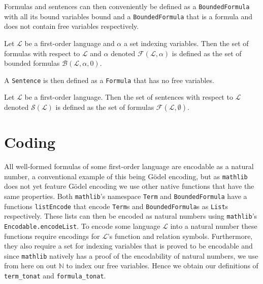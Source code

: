 Formulas and sentences can then conveniently be defined as a \texttt{BoundedFormula} with all its bound variables bound and a \texttt{BoundedFormula} that is a formula and does not contain free variables respectively.

\begin{definition}\label{def:FO-Formula}
  \leanok
    Let $\mathcal{L}$ be a first-order language and $\alpha$ a set indexing variables. Then the set of formulas with respect to $\mathcal{L}$ and $\alpha$ denoted $\mathcal{F}(\mathcal{L},\alpha)$ is defined as the set of bounded formulas $\mathcal{B}(\mathcal{L},\alpha,0)$.
\end{definition}

A \texttt{Sentence} is then defined as a \texttt{Formula} that has no free variables.

\begin{definition}\label{def:FO-Sentence}
  \leanok
    Let $\mathcal{L}$ be a first-order language. Then the set of sentences with respect to $\mathcal{L}$ denoted $\mathcal{S}(\mathcal{L})$ is defined as the set of formulas $\mathcal{F}(\mathcal{L},\emptyset)$.
\end{definition}

\section{Coding}\label{subsec:coding}
All well-formed formulas of some first-order language are encodable as a natural number, a conventional example of this being Gödel encoding, but as \texttt{mathlib} does not yet feature Gödel encoding we use other native functions that have the same properties. Both \texttt{mathlib}'s namespace \texttt{Term} and \texttt{BoundedFormula} have a functions \texttt{listEncode} that encode \texttt{Term}s and \texttt{BoundedFormula}s as \texttt{List}s respectively. These lists can then be encoded as natural numbers using \texttt{mathlib}'s \texttt{Encodable.encodeList}. To encode some language $\mathcal{L}$ into a natural number these functions require encodings for $\mathcal{L}$'s function and relation symbols. Furthermore, they also require a set for indexing variables that is proved to be encodable and since \texttt{mathlib} natively has a proof of the encodability of natural numbers, we use from here on out $\mathbb{N}$ to index our free variables. Hence we obtain our definitions of \texttt{term\_tonat} and \texttt{formula\_tonat}.

